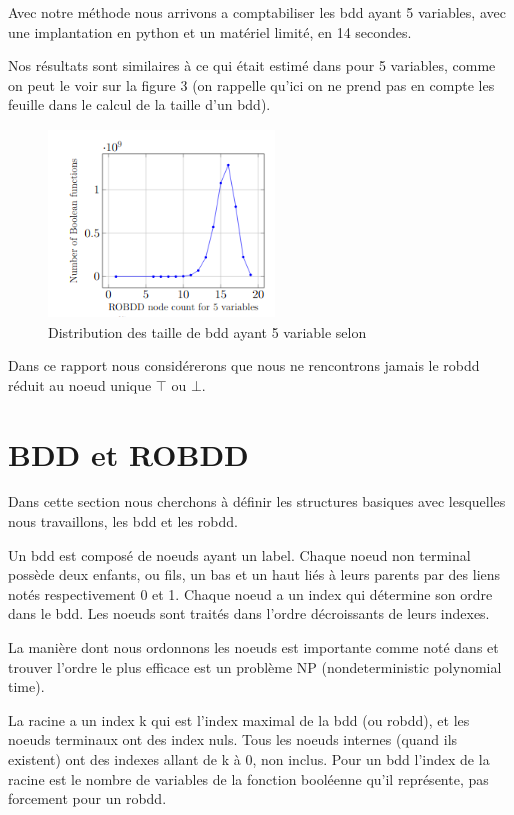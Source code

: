 \documentclass[french]{article}
\begin{document}
Avec notre méthode nous arrivons a comptabiliser les bdd ayant 5 variables, avec une implantation en python et un matériel limité, en 14 secondes.\medskip

Nos résultats sont similaires à ce qui était estimé dans \cite{newton} pour 5 variables, comme on peut le voir sur la figure 3 (on rappelle qu'ici on ne prend pas en compte les feuille dans le calcul de la taille d'un bdd).\medskip

\begin{figure}[htp]
    \centering
    \includegraphics[width=6cm, height=5cm]{screen de newton.png}
    \caption{Distribution des taille de bdd ayant 5 variable selon \cite{newton}}
    \label{fig:Figure1.2}
\end{figure}

Dans ce rapport nous considérerons que nous ne rencontrons jamais le robdd réduit au noeud unique \(\top\) ou \(\bot.\)
\newpage
\section{BDD et ROBDD}
Dans cette section nous cherchons à définir les structures basiques avec lesquelles nous travaillons, les bdd et les robdd.

Un bdd est composé de noeuds ayant un label. Chaque noeud non terminal possède deux enfants, ou fils, un bas et un haut liés à leurs parents par des liens notés respectivement 0 et 1. Chaque noeud a un index qui détermine son ordre dans le bdd. Les noeuds sont traités dans l'ordre décroissants de leurs indexes.

La manière dont nous ordonnons les noeuds est importante comme noté dans \cite{newton} et trouver l'ordre le plus efficace est un problème NP (nondeterministic polynomial time).

La racine a un index k qui est l'index maximal de la bdd (ou robdd), et les noeuds terminaux ont des index nuls. Tous les noeuds internes (quand ils existent) ont des indexes allant de k à 0, non inclus. Pour un bdd l'index de la racine est le nombre de variables de la fonction booléenne qu'il représente, pas forcement pour un robdd.
\end{document}
